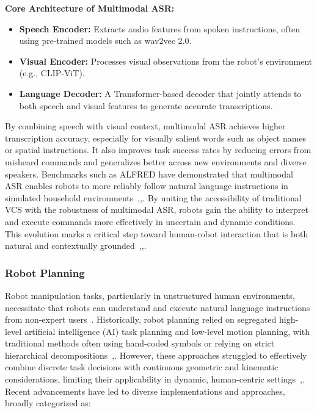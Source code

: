 \documentclass[12pt]{extarticle}
\begin{document}
\textbf{Core Architecture of Multimodal ASR:}
\begin{itemize}
    \item \textbf{Speech Encoder:} Extracts audio features from spoken instructions, often using pre-trained models such as wav2vec 2.0.
    \item \textbf{Visual Encoder:} Processes visual observations from the robot’s environment (e.g., CLIP-ViT).
    \item \textbf{Language Decoder:} A Transformer-based decoder that jointly attends to both speech and visual features to generate accurate transcriptions.
\end{itemize}

By combining speech with visual context, multimodal ASR achieves higher transcription accuracy, especially for visually salient words such as object names or spatial instructions. It also improves task success rates by reducing errors from misheard commands and generalizes better across new environments and diverse speakers. Benchmarks such as ALFRED have demonstrated that multimodal ASR enables robots to more reliably follow natural language instructions in simulated household environments~\cite{vcs},\cite{Chang2023},\cite{multi}. By uniting the accessibility of traditional VCS with the robustness of multimodal ASR, robots gain the ability to interpret and execute commands more effectively in uncertain and dynamic conditions. This evolution marks a critical step toward human-robot interaction that is both natural and contextually grounded~\cite{vcs},\cite{Chang2023},\cite{multi}.

\subsubsection{Robot Planning}

Robot manipulation tasks, particularly in unstructured human environments, necessitate that robots can understand and execute natural language instructions from non-expert users~\cite{cliport}. Historically, robot planning relied on segregated high-level artificial intelligence (AI) task planning and low-level motion planning, with traditional methods often using hand-coded symbols or relying on strict hierarchical decompositions~\cite{learning-neuro-symbolic},\cite{code-as-symbolic-planner}. However, these approaches struggled to effectively combine discrete task decisions with continuous geometric and kinematic considerations, limiting their applicability in dynamic, human-centric settings~\cite{cliport},\cite{code-as-symbolic-planner}.
Recent advancements have led to diverse implementations and approaches, broadly categorized as:
\end{document}
